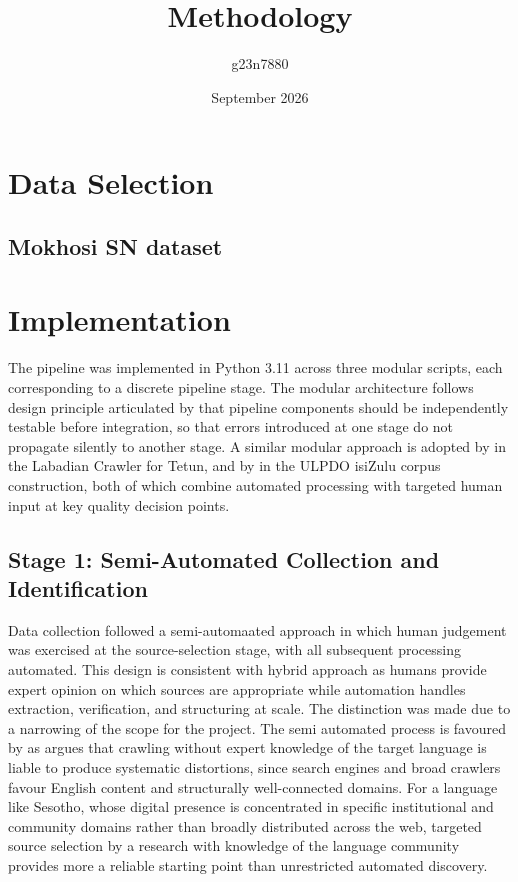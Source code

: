 \documentclass[11pt,a4paper]{article}
\title{Methodology}
\author{g23n7880 }
\date{September 2026}
\begin{document}
\maketitle

\section{Data Selection}
\label{sec: data_selection}
\subsection{Mokhosi SN dataset}


\section{Implementation}
The pipeline was implemented in Python 3.11 across three modular scripts, each corresponding to a discrete pipeline stage. The modular architecture follows design principle articulated by \citet{suchomel2020better} that pipeline components should be independently testable before integration, so that errors introduced at one stage do not propagate silently to another stage. A similar modular approach is adopted by \citet{de2024data} in the Labadian Crawler for Tetun, and by \citet{gumede2025creating} in the ULPDO isiZulu corpus construction, both of which combine automated processing with targeted human input at key quality decision points.

\subsection{Stage 1: Semi-Automated Collection and Identification}
Data collection followed a semi-automaated approach in which  human judgement was exercised at the source-selection stage, with all subsequent processing automated. This design is consistent with \citet{gumede2025creating} hybrid approach as humans provide expert opinion on which sources are appropriate while automation handles extraction, verification, and structuring at scale. The distinction was made due to a narrowing of the scope for the project. The semi automated process is favoured by \citet{barbaresi2013challenges} as \citet{barbaresi2013challenges} argues that crawling without expert knowledge of the target language is liable to produce systematic distortions, since search engines and broad crawlers favour English content and structurally well-connected domains. For a language like Sesotho, whose digital presence is concentrated in specific institutional and community domains rather than broadly distributed across the web, targeted source selection by a research with knowledge of the language community provides more a reliable starting point than unrestricted automated discovery.
\end{document}
